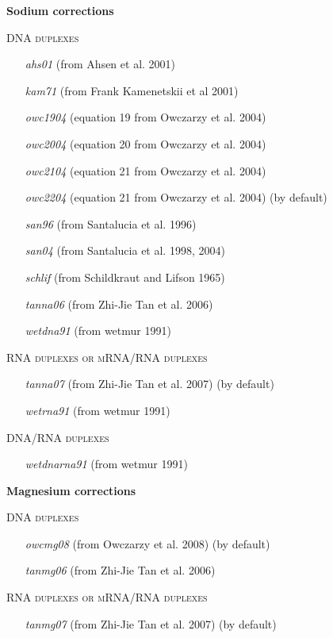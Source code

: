 \documentclass{article}
\begin{document}
\begin{description}
    \textbf{Sodium corrections}
    
    \textsc{DNA duplexes}
      \begin{itemize}
      \item [\textit{ahs01}] (from Ahsen et al. 2001)
      \item [\textit{kam71}] (from Frank Kamenetskii et al 2001)
      \item [\textit{owc1904}] (equation 19 from Owczarzy et al. 2004)
      \item [\textit{owc2004}] (equation 20 from Owczarzy et al. 2004)
      \item [\textit{owc2104}] (equation 21 from Owczarzy et al. 2004)
      \item [\textit{owc2204}] (equation 21 from Owczarzy et al. 2004)  (by default)
      \item [\textit{san96}] (from Santalucia et al. 1996)
      \item [\textit{san04}] (from Santalucia et al. 1998, 2004)
      \item [\textit{schlif}] (from Schildkraut and Lifson 1965)
      \item [\textit{tanna06}] (from Zhi-Jie Tan et al. 2006)
      \item [\textit{wetdna91}] (from wetmur 1991)	 
      \end{itemize}
    \textsc{RNA duplexes or mRNA/RNA duplexes}
      \begin{itemize}
      \item [\textit{tanna07}] (from Zhi-Jie Tan et al. 2007)  (by default)
      \item [\textit{wetrna91}] (from wetmur 1991)	 
      \end{itemize}
    \textsc{DNA/RNA duplexes}
      \begin{itemize}
      \item [\textit{wetdnarna91}] (from wetmur 1991)	 
      \end{itemize}
  
  \textbf{Magnesium corrections}
  
    \textsc{DNA duplexes}
      \begin{itemize}
      \item [\textit{owcmg08}] (from Owczarzy et al. 2008)  (by default)
      \item [\textit{tanmg06}] (from Zhi-Jie Tan et al. 2006)	  
      \end{itemize}
    \textsc{RNA duplexes or mRNA/RNA duplexes}
      \begin{itemize}
      \item [\textit{tanmg07}] (from Zhi-Jie Tan et al. 2007)  (by default)
      \end{itemize}
    

\end{description}
\end{document}
